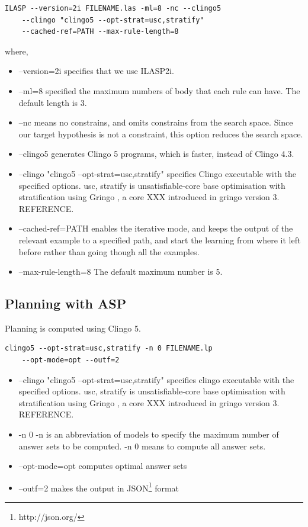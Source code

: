 
\begin{lstlisting}[]
    ILASP --version=2i FILENAME.las -ml=8 -nc --clingo5 
    --clingo "clingo5 --opt-strat=usc,stratify" 
    --cached-ref=PATH --max-rule-length=8
\end{lstlisting}

where,
\begin{itemize}
\item \textsf{--version=2i} specifies that we use ILASP2i.
\item \textsf{--ml=8} specified the maximum numbers of body that each rule can have. The default length is 3.
\item \textsf{--nc} means no constrains, and omits constrains from the search space. Since our target hypothesis is not a constraint, this option reduces the search space.
\item \textsf{--clingo5} generates Clingo 5 programs, which is faster, instead of Clingo 4.3.
\item \textsf{--clingo "clingo5 --opt-strat=usc,stratify"} specifies Clingo executable with the specified options. 
\textsf{usc, stratify} is unsatisfiable-core base optimisation with stratification using Gringo \cite{gringo}, a core XXX introduced in gringo version 3. REFERENCE.
\item \textsf{--cached-ref=PATH} enables the iterative mode, and keeps the output of the relevant example to a specified path, and start the learning from where it left before rather than going though all the examples.
\item \textsf{--max-rule-length=8} The default maximum number is 5.
\end{itemize}

\subsection{Planning with ASP}
Planning is computed using Clingo 5.

\begin{lstlisting}[]
    clingo5 --opt-strat=usc,stratify -n 0 FILENAME.lp
    --opt-mode=opt --outf=2
\end{lstlisting}

\begin{itemize}
\item \textsf{--clingo "clingo5 --opt-strat=usc,stratify"} specifies clingo executable with the specified options. 
\textsf{usc, stratify} is unsatisfiable-core base optimisation with stratification using Gringo \cite{gringo}, a core XXX introduced in gringo version 3. REFERENCE.
\item \textsf{-n 0} -n is an abbreviation of \textsf{models} to specify the maximum number of answer sets to be computed. \textsf{-n 0} means to compute all answer sets.
\item \textsf{--opt-mode=opt} computes optimal answer sets
\item \textsf{--outf=2} makes the output in JSON\footnote{http://json.org/} format
\end{itemize}

